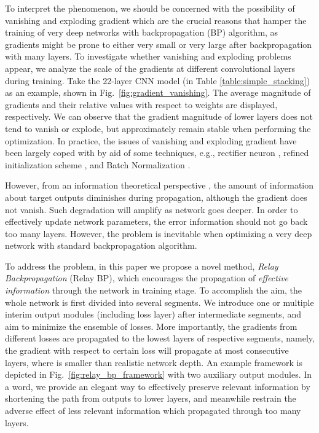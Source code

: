 \documentclass[runningheads]{llncs}
\begin{document}
To interpret the phenomenon, we should be concerned with the possibility of vanishing and exploding gradient which are the crucial reasons that hamper the training of very deep networks with backpropagation \cite{lecun_1998} (BP) algorithm, as gradients might be prone to either very small or very large after backpropagation with many layers. To investigate whether vanishing and exploding problems appear, we analyze the scale of the gradients at different convolutional layers during training. Take the 22-layer CNN model (in Table \ref{table:simple_stacking}) as an example, shown in Fig.~\ref{fig:gradient_vanishing}. The average magnitude of gradients and their relative values with respect to weights are displayed, respectively. We can observe that the gradient magnitude of lower layers does not tend to vanish or explode, but approximately remain stable when performing the optimization. In practice, the issues of vanishing and exploding gradient have been largely coped with by aid of some techniques, e.g., rectifier neuron \cite{nair_icml2010,maas_icml2013}, refined initialization scheme \cite{glorot_icais2010,he_iccv2015}, and Batch Normalization \cite{ioffe_2015}.

However, from an information theoretical perspective \cite{kaminura_2002,cover_2006,tishby_2015}, the amount of information about target outputs diminishes during propagation, although the gradient does not vanish. Such degradation will amplify as network goes deeper. In order to effectively update network parameters, the error information should not go back too many layers. However, the problem is inevitable when optimizing a very deep network with standard backpropagation algorithm.

To address the problem, in this paper we propose a novel method, {\it Relay Backpropagation} (Relay BP), which encourages the propagation of {\it effective information} through the network in training stage. To accomplish the aim, the whole network is first divided into several segments. We introduce one or multiple interim output modules (including loss layer) after intermediate segments, and aim to minimize the ensemble of losses. More importantly, the gradients from different losses are propagated to the lowest layers of respective segments, namely, the gradient with respect to certain loss will propagate at most  consecutive layers, where  is smaller than realistic network depth. An example framework is depicted in Fig.~\ref{fig:relay_bp_framework} with two auxiliary output modules. In a word, we provide an elegant way to effectively preserve relevant information by shortening the path from outputs to lower layers, and meanwhile restrain the adverse effect of less relevant information which propagated through too many layers.
\end{document}
